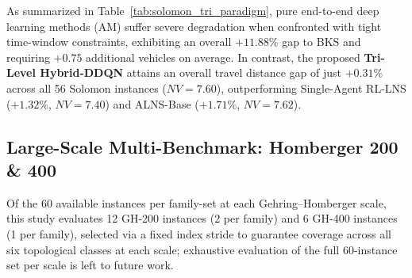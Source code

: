 \documentclass{ieeeaccess}
\begin{document}
As summarized in Table~\ref{tab:solomon_tri_paradigm}, pure end-to-end deep learning methods (AM) suffer severe degradation when confronted with tight time-window constraints, exhibiting an overall $+11.88\%$ gap to BKS and requiring $+0.75$ additional vehicles on average. In contrast, the proposed \textbf{Tri-Level Hybrid-DDQN} attains an overall travel distance gap of just $+0.31\%$ across all 56 Solomon instances ($NV=7.60$), outperforming Single-Agent RL-LNS ($+1.32\%$, $NV=7.40$) and ALNS-Base ($+1.71\%$, $NV=7.62$).

\subsection{Large-Scale Multi-Benchmark: Homberger 200 \& 400}
\label{sec:homberger_results}

Of the 60 available instances per family-set at each Gehring--Homberger scale, this study evaluates 12 GH-200 instances (2 per family) and 6 GH-400 instances (1 per family), selected via a fixed index stride to guarantee coverage across all six topological classes at each scale; exhaustive evaluation of the full 60-instance set per scale is left to future work.
\end{document}
